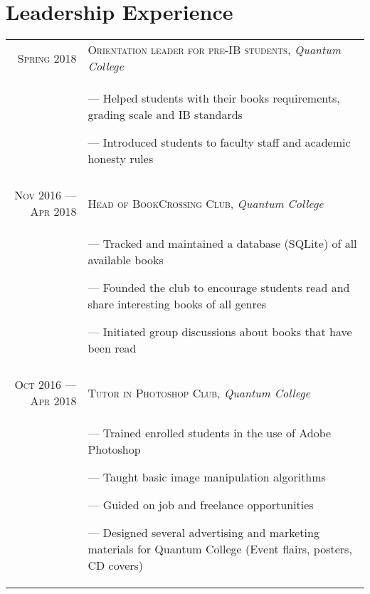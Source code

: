 \documentclass[a4paper,10pt]{article}
\begin{document}
\section{Leadership Experience}
\begin{tabular}{r|p{11cm}}

  \textsc{Spring 2018} &  \textsc{Orientation leader for pre-IB students}, \emph{Quantum College}\\&\footnotesize{
  --- Helped students with their books requirements, grading scale and IB standards

  --- Introduced students to faculty staff and academic honesty rules
  } \\\multicolumn{2}{c}{}\\

  \textsc{Nov 2016 --- Apr 2018} &  \textsc{Head of BookCrossing Club}, \emph{Quantum College}\\&\footnotesize{
  --- Tracked and maintained a database (SQLite) of all available books

  --- Founded the club to encourage students read and share interesting books of all genres

  --- Initiated group discussions about books that have been read
  } \\\multicolumn{2}{c}{}\\

  \textsc{Oct 2016 --- Apr 2018} &  \textsc{Tutor in Photoshop Club}, \emph{Quantum College}\\&\footnotesize{
  --- Trained enrolled students in the use of Adobe Photoshop

  --- Taught basic image manipulation algorithms

  --- Guided on job and freelance opportunities

  --- Designed several advertising and marketing materials for Quantum College (Event flairs, posters, CD covers)
  } \\%
  
\end{tabular}


\end{document}
